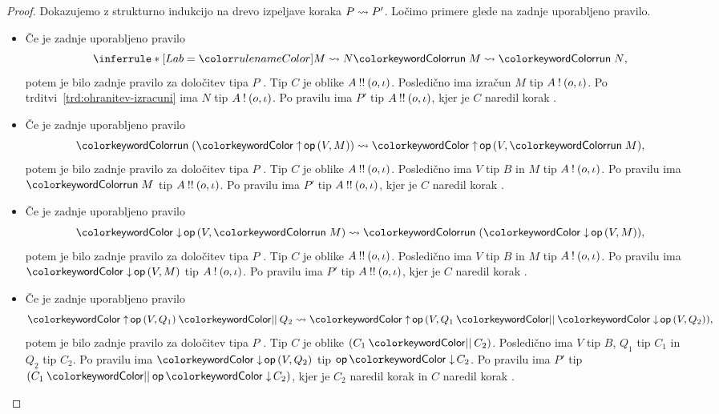 \begin{proof}
	Dokazujemo z strukturno indukcijo na drevo izpeljave koraka $P \leadsto P'$.
	Ločimo primere glede na zadnje uporabljeno pravilo.
	
	\begin{itemize}
		\item Če je zadnje uporabljeno pravilo
		$$
		\coopinfer{}{
			M \reduces N
		}{
			\tmrun M \reduces \tmrun N
		},$$
		potem je bilo zadnje pravilo za določitev tipa $P$ . Tip $C$ je oblike $A \mathbin{!!} (o, \iota)$.
		Posledično ima izračun $M$ tip $A \mathbin{!} (o, \iota)$. Po trditvi~\ref{trd:ohranitev-izracuni} ima $N$ tip $A \mathbin{!} (o, \iota)$.
		Po pravilu  ima $P'$ tip $A \mathbin{!!} (o, \iota)$, kjer je $C$ naredil korak .
	
		\item Če je zadnje uporabljeno pravilo
		$$\tmrun {(\tmopout{op}{V}{M})}  \reduces \tmopout{op}{V}{\tmrun M},$$
		potem je bilo zadnje pravilo za določitev tipa $P$ . Tip $C$ je oblike $A \mathbin{!!} (o, \iota)$.
		Posledično ima $V$ tip $B$ in $M$ tip $A \mathbin{!} (o, \iota)$.
		Po pravilu  ima $\tmrun{M}$ tip $A \mathbin{!!} (o, \iota)$.
		Po pravilu  ima $P'$ tip $A \mathbin{!!} (o, \iota)$, kjer je $C$ naredil korak .
		
		\item Če je zadnje uporabljeno pravilo
		$$\tmopin{op}{V}{\tmrun M} \reduces \tmrun {(\tmopin{op}{V}{M})},$$
		potem je bilo zadnje pravilo za določitev tipa $P$ . Tip $C$ je oblike $A \mathbin{!!} (o, \iota)$.
		Posledično ima $V$ tip $B$ in $M$ tip $A \mathbin{!} (o, \iota)$.
		Po pravilu  ima $\tmopin{op}{V}{M}$ tip $A \mathbin{!} (o, \iota)$.
		Po pravilu  ima $P'$ tip $A \mathbin{!!} (o, \iota)$, kjer je $C$ naredil korak .
		
		\item Če je zadnje uporabljeno pravilo
		$$\tmpar{\tmopout{op}{V}{Q_1}}{Q_2} \reduces \tmopout{op}{V}{\tmpar{Q_1}{\tmopin{op}{V}{Q_2}}},$$
		potem je bilo zadnje pravilo za določitev tipa $P$ . Tip $C$ je oblike $\typar{C_1}{C_2}$.
		Posledično ima $V$ tip $B$, $Q_1$ tip $C_1$ in $Q_2$ tip $C_2$.
		Po pravilu  ima $\tmopin{op}{V}{Q_2}$ tip $\opincomp{op}{C_2}$.
		Po pravilu  ima $P'$ tip $\typar{C_1}{\opincomp{op}{C_2}}$, kjer je $C_2$ naredil korak  in $C$ naredil korak .


\end{itemize}
\end{proof}
